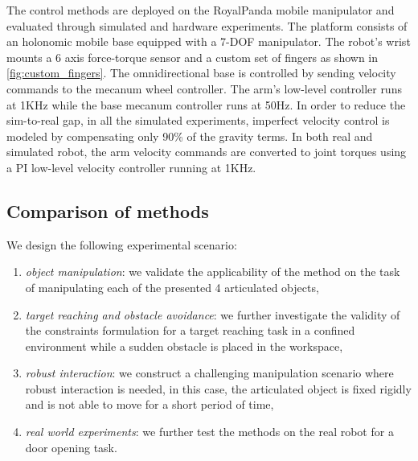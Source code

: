 The control methods are deployed on the RoyalPanda mobile manipulator and evaluated through simulated and hardware experiments. The platform consists of an holonomic mobile base equipped with a 7-DOF manipulator. The robot's wrist mounts a 6 axis force-torque sensor and a custom set of fingers as shown in \fig\ref{fig:custom_fingers}.  The omnidirectional base is controlled by sending velocity commands to the mecanum wheel controller. The arm's low-level controller runs at 1KHz while the base mecanum controller runs at 50Hz. In order to reduce the sim-to-real gap, in all the simulated experiments, imperfect velocity control is modeled by compensating only 90\% of the gravity terms. In both real and simulated robot, the arm velocity commands are converted to joint torques using a PI low-level velocity controller running at 1KHz. 




\subsection{Comparison of methods}
We design the following experimental scenario:
\begin{enumerate}
    \item \textit{object manipulation}: we validate the applicability of the method on the task of manipulating each of the presented 4 articulated objects,   
    \item \textit{target reaching and obstacle avoidance}: we further investigate the validity of the constraints formulation for a target reaching task in a confined environment while a sudden obstacle is placed in the workspace,
    \item \textit{robust interaction}: we construct a challenging manipulation scenario where robust interaction is needed, in this case, the articulated object is fixed rigidly and is not able to move for a short period of time,
    \item \textit{real world experiments}: we further test the methods on the real robot for a door opening task. 
\end{enumerate}

